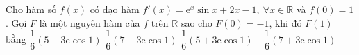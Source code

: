 \begin{ex}%
Cho hàm số $f(x)$ có đạo hàm $f'(x)=\mathrm{e}^x \sin x+2 x-1,~ \forall x \in \mathbb{R}$ và $f(0)=1$. Gọi $F$ là một nguyên hàm của $f$ trên $\mathbb{R}$ sao cho $F(0)=-1$, khi đó $F(1)$ bằng
\choice
{\True $\dfrac{1}{6}(5-3\mathrm{e} \cos 1)$}
{$\dfrac{1}{6}(7-3\mathrm{e} \cos 1)$}
{$\dfrac{1}{6}(5+3\mathrm{e}\cos 1)$}
{$-\dfrac{1}{6}(7+3\mathrm{e} \cos 1)$}
\end{ex}
